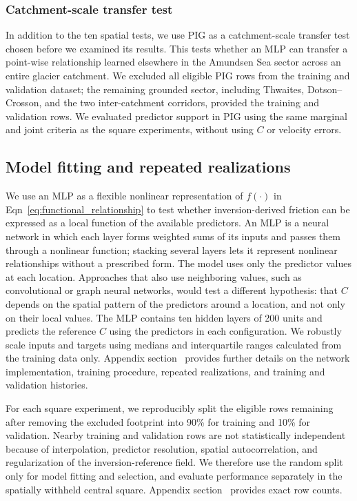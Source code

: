 \documentclass[review,jog]{igs}
\begin{document}
\subsubsection{Catchment-scale transfer test}

In addition to the ten spatial tests, we use PIG as a catchment-scale transfer test chosen before we examined its results. This tests whether an MLP can transfer a point-wise relationship learned elsewhere in the Amundsen Sea sector across an entire glacier catchment. We excluded all eligible PIG rows from the training and validation dataset; the remaining grounded sector, including Thwaites, Dotson--Crosson, and the two inter-catchment corridors, provided the training and validation rows. We evaluated predictor support in PIG using the same marginal and joint criteria as the square experiments, without using $C$ or velocity errors. 

\subsection{Model fitting and repeated realizations}

We use an MLP as a flexible nonlinear representation of $f(\cdot)$ in Eqn~\ref{eq:functional_relationship} to test whether inversion-derived friction can be expressed as a local function of the available predictors. An MLP is a neural network in which each layer forms weighted sums of its inputs and passes them through a nonlinear function; stacking several layers lets it represent nonlinear relationships without a prescribed form. The model uses only the predictor values at each location. Approaches that also use neighboring values, such as convolutional or graph neural networks, would test a different hypothesis: that $C$ depends on the spatial pattern of the predictors around a location, and not only on their local values. The MLP contains ten hidden layers of 200 units and predicts the reference \(C\) using the predictors in each configuration. We robustly scale inputs and targets using medians and interquartile ranges calculated from the training data only. Appendix section~ provides further details on the network implementation, training procedure, repeated realizations, and training and validation histories.

For each square experiment, we reproducibly split the eligible rows remaining after removing the excluded footprint into 90\% for training and 10\% for validation. Nearby training and validation rows are not statistically
independent because of interpolation, predictor resolution, spatial
autocorrelation, and regularization of the inversion-reference field. We therefore use the random split only for model fitting and selection, and evaluate performance separately in the spatially withheld central square. Appendix section~ provides exact row counts.
\end{document}
